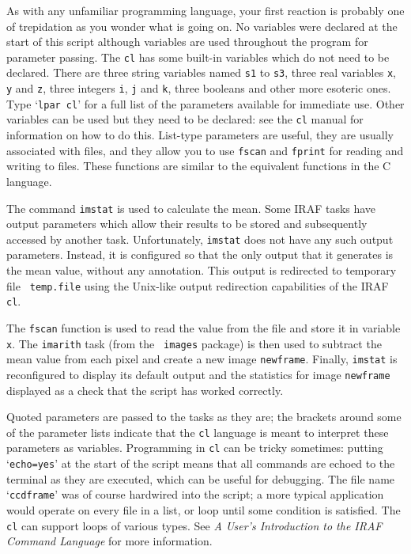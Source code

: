 \documentclass[twoside,11pt]{article}
\begin{document}
As with any unfamiliar programming language, your first reaction is
probably one of trepidation as you wonder what is going on.  No variables
were declared at the start of this script although variables are used
throughout the program for parameter passing. The {\tt cl} has some built-in
variables which do not need to be declared. There are three string
variables named {\tt s1} to {\tt s3}, three real variables
{\tt x}, {\tt y} and {\tt z}, three
integers {\tt i}, {\tt j} and {\tt k},
three booleans and other more esoteric ones. Type
`{\tt lpar cl}' for a full list of the parameters available for
immediate use. Other variables can be used but they need to be
declared: see the {\tt cl} manual\cite{SHAMES86} for information on how to
do this. List-type parameters are useful, they are usually associated
with files, and they allow you to use {\tt fscan} and {\tt fprint}
for reading and
writing to files.  These functions are similar to the equivalent functions
in the C language.

The command {\tt imstat} is used to calculate the mean.  Some IRAF
tasks have output parameters which allow their results to be stored
and subsequently accessed by another task.  Unfortunately, {\tt imstat}
does not have any such output parameters.  Instead, it is configured
so that the only output that it generates is the mean value, without
any annotation.  This output is redirected to temporary file {\tt
temp.file} using the Unix-like output redirection capabilities of
the IRAF {\tt cl}.

The {\tt fscan} function is used to read the value from the file and
store it in variable {\tt x}.  The {\tt imarith} task (from the {\tt
images} package) is then used to subtract the mean value from each
pixel and create a new image {\tt newframe}.  Finally, {\tt imstat} is
reconfigured to display its default output and the statistics for image
{\tt newframe}  displayed as a check that the script has worked correctly.

Quoted parameters are passed to the tasks as they are; the brackets
around some of the parameter lists indicate that the {\tt cl} language is
meant to interpret these parameters as variables.  Programming in {\tt cl}
can be tricky sometimes: putting `{\tt echo=yes}' at the start of
the script means that all commands are echoed to the terminal as they
are executed, which can be useful for debugging.  The file name
`{\tt ccdframe}' was of course hardwired into the script; a more
typical application would operate on every file in a list, or loop
until some condition is satisfied. The {\tt cl} can support loops of
various types.  See {\it A User's Introduction to the IRAF Command
Language}\/\cite{SHAMES86} for more information.
\end{document}
